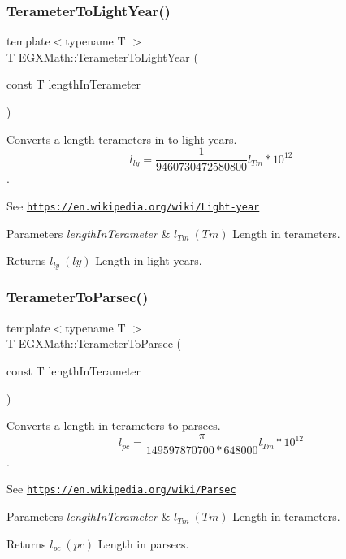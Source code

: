 \subsubsection{\texorpdfstring{Terameter\+To\+Light\+Year()}{TerameterToLightYear()}}
{\footnotesize\ttfamily template$<$typename T $>$ \\
T E\+G\+X\+Math\+::\+Terameter\+To\+Light\+Year (\begin{DoxyParamCaption}\item[{const T}]{length\+In\+Terameter }\end{DoxyParamCaption})}



Converts a length terameters in to light-\/years. \[ l_{ly}= \frac{1}{9460730472580800} l_{Tm} * 10^{12} \]. 

See \href{https://en.wikipedia.org/wiki/Light-year}{\tt https\+://en.\+wikipedia.\+org/wiki/\+Light-\/year} 
\begin{DoxyParams}{Parameters}
{\em length\+In\+Terameter} & $ l_{Tm}\ (Tm)$ Length in terameters. \\
\hline
\end{DoxyParams}
\begin{DoxyReturn}{Returns}
$ l_{ly}\ (ly)$ Length in light-\/years. 
\end{DoxyReturn}
\mbox{\label{group___e_g_x_math-_conversions-_length_conversions-_terameter-_astronomical_gac203b94b19db6ed8181e78413fafcf58}} 
\subsubsection{\texorpdfstring{Terameter\+To\+Parsec()}{TerameterToParsec()}}
{\footnotesize\ttfamily template$<$typename T $>$ \\
T E\+G\+X\+Math\+::\+Terameter\+To\+Parsec (\begin{DoxyParamCaption}\item[{const T}]{length\+In\+Terameter }\end{DoxyParamCaption})}



Converts a length in terameters to parsecs. \[ l_{pc}=\frac{\pi}{149597870700 * 648000} l_{Tm} * 10^{12} \]. 

See \href{https://en.wikipedia.org/wiki/Parsec}{\tt https\+://en.\+wikipedia.\+org/wiki/\+Parsec} 
\begin{DoxyParams}{Parameters}
{\em length\+In\+Terameter} & $ l_{Tm}\ (Tm)$ Length in terameters. \\
\hline
\end{DoxyParams}
\begin{DoxyReturn}{Returns}
$ l_{pc}\ (pc)$ Length in parsecs. 
\end{DoxyReturn}
